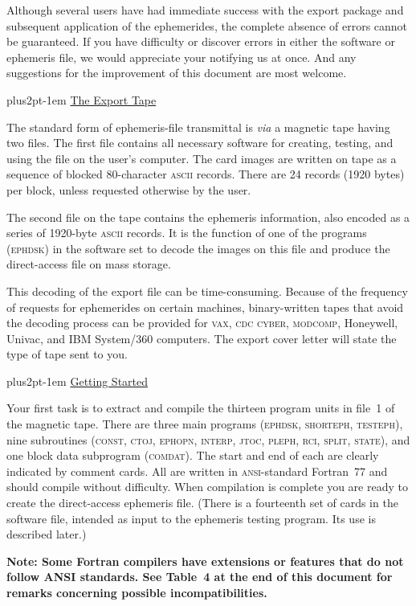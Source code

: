 \documentclass[twoside,11pt,nolof]{starlink}
\providecommand{\hdg}[1]{\vskip4pt plus2pt\leavevmode\kern-1em \underline{\large{#1}}\par}
\begin{document}
Although several users have had immediate success with the export
package and subsequent application of the ephemerides, the complete
absence of errors cannot be guaranteed. If you have difficulty
or discover errors in either the software or ephemeris file,
we would appreciate your notifying us at once. And any suggestions
for the improvement of this document are most welcome.

\hdg{The Export Tape}

The standard form of ephemeris-file transmittal is {\sl via\/}
a magnetic tape having two files. The first file contains
all necessary software for creating, testing, and using the file
on the user's computer. The card images are written on tape as a sequence
of blocked 80-character \textsc{ascii} records. There are 24 records
(1920 bytes)
per block, unless requested otherwise by the user.

The second file on the tape contains the ephemeris information,
also encoded as a series of 1920-byte \textsc{ascii} records.
It is the function of one of the programs (\textsc{ephdsk}) in the software
set to decode the images on this file and produce the direct-access
file on mass storage.

This decoding of the export file can be
time-consuming. Because of the frequency of requests for ephemerides
on certain machines, binary-written tapes that avoid the
decoding process can be provided for \textsc{vax, cdc cyber, modcomp},
Honeywell, Univac, and IBM System/360 computers.
The export cover letter will state the type of tape sent to you.


\hdg{Getting Started}

Your first task is to extract and compile the thirteen program
units in file~1 of the magnetic tape. There are three main programs
(\textsc{ephdsk, shorteph, testeph}), nine subroutines (\textsc{const,
ctoj, ephopn, interp, jtoc, pleph, rci, split, state}), and one block
data subprogram (\textsc{comdat}).  The start and end of each are clearly
indicated by comment cards. All are written in \textsc{ansi}-standard
Fortran~77 and should compile without difficulty. When compilation
is complete you are ready to create the direct-access ephemeris file.
(There is a fourteenth set of cards in the software file, intended as
input to the ephemeris testing program. Its use is described later.)

\textbf{Note: Some Fortran compilers have extensions or features that
do not follow ANSI standards. See Table~4 at the end of this document
for remarks concerning possible incompatibilities.}
\end{document}

